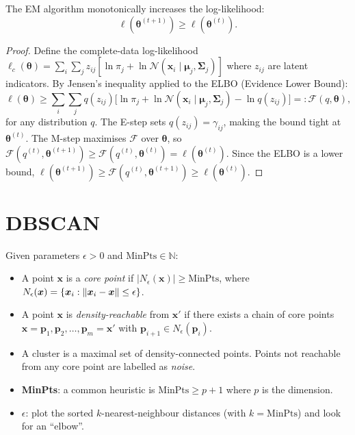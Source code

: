 \begin{theorem}[EM Monotonicity]
The EM algorithm monotonically increases the log-likelihood:
\[
  \ell(\bm{\theta}^{(t+1)}) \geq \ell(\bm{\theta}^{(t)}).
\]
\end{theorem}

\begin{proof}
Define the complete-data log-likelihood $\ell_c(\bm{\theta})=\sum_i\sum_j z_{ij}[\ln\pi_j+\ln\mathcal{N}(\bm{x}_i\mid\bm{\mu}_j,\bm{\Sigma}_j)]$ where $z_{ij}$ are latent indicators. By Jensen's inequality applied to the ELBO (Evidence Lower Bound):
\[
  \ell(\bm{\theta}) \geq \sum_i\sum_j q(z_{ij})\bigl[\ln\pi_j + \ln\mathcal{N}(\bm{x}_i\mid\bm{\mu}_j,\bm{\Sigma}_j) - \ln q(z_{ij})\bigr]
  =: \mathcal{F}(q,\bm{\theta}),
\]
for any distribution $q$. The E-step sets $q(z_{ij})=\gamma_{ij}$, making the bound tight at $\bm{\theta}^{(t)}$. The M-step maximises $\mathcal{F}$ over $\bm{\theta}$, so $\mathcal{F}(q^{(t)},\bm{\theta}^{(t+1)})\geq\mathcal{F}(q^{(t)},\bm{\theta}^{(t)})=\ell(\bm{\theta}^{(t)})$. Since the ELBO is a lower bound, $\ell(\bm{\theta}^{(t+1)})\geq\mathcal{F}(q^{(t)},\bm{\theta}^{(t+1)})\geq\ell(\bm{\theta}^{(t)})$.
\end{proof}

\section{DBSCAN}

\begin{definition}[DBSCAN]
Given parameters $\epsilon>0$ and $\text{MinPts}\in\mathbb{N}$:
\begin{itemize}
  \item A point $\bm{x}$ is a \emph{core point} if $|N_\epsilon(\bm{x})|\geq\text{MinPts}$, where $N_\epsilon(\bm{x})=\{\bm{x}_i:\left\| \bm{x}_i-\bm{x} \right\|\leq\epsilon\}$.
  \item A point $\bm{x}$ is \emph{density-reachable} from $\bm{x}'$ if there exists a chain of core points $\bm{x}=\bm{p}_1,\bm{p}_2,\dots,\bm{p}_m=\bm{x}'$ with $\bm{p}_{i+1}\in N_\epsilon(\bm{p}_i)$.
  \item A cluster is a maximal set of density-connected points. Points not reachable from any core point are labelled as \emph{noise}.
\end{itemize}
\end{definition}

\begin{bestpractice}[title=\textbf{Choosing DBSCAN Parameters}]
\begin{itemize}
  \item \textbf{MinPts}: a common heuristic is $\text{MinPts}\geq p+1$ where $p$ is the dimension.
  \item \textbf{$\epsilon$}: plot the sorted $k$-nearest-neighbour distances (with $k=\text{MinPts}$) and look for an ``elbow''.
\end{itemize}
\end{bestpractice}

